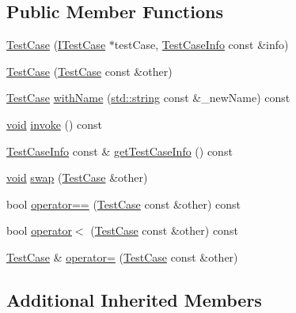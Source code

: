 \subsection*{Public Member Functions}
\begin{DoxyCompactItemize}
\item 
\hyperlink{class_catch_1_1_test_case_a03a5b913484681bd6d398dc5e9c2a907}{Test\+Case} (\hyperlink{struct_catch_1_1_i_test_case}{I\+Test\+Case} $\ast$test\+Case, \hyperlink{struct_catch_1_1_test_case_info}{Test\+Case\+Info} const \&info)
\item 
\hyperlink{class_catch_1_1_test_case_ac0011d3789edc3e44edb41f13c4775a0}{Test\+Case} (\hyperlink{class_catch_1_1_test_case}{Test\+Case} const \&other)
\item 
\hyperlink{class_catch_1_1_test_case}{Test\+Case} \hyperlink{class_catch_1_1_test_case_ab6dbc6c82b7c1680013c67bdedccfc8e}{with\+Name} (\hyperlink{_s_d_l__opengl__glext_8h_ae84541b4f3d8e1ea24ec0f466a8c568b}{std\+::string} const \&\+\_\+new\+Name) const 
\item 
\hyperlink{_s_d_l__opengles2__gl2ext_8h_ae5d8fa23ad07c48bb609509eae494c95}{void} \hyperlink{class_catch_1_1_test_case_aac2e028135cc88c3e3aac04650960a6c}{invoke} () const 
\item 
\hyperlink{struct_catch_1_1_test_case_info}{Test\+Case\+Info} const \& \hyperlink{class_catch_1_1_test_case_a25c03661ab092431cdff10df5c58a5a7}{get\+Test\+Case\+Info} () const 
\item 
\hyperlink{_s_d_l__opengles2__gl2ext_8h_ae5d8fa23ad07c48bb609509eae494c95}{void} \hyperlink{class_catch_1_1_test_case_aee38f908faf10b905b209ca388275413}{swap} (\hyperlink{class_catch_1_1_test_case}{Test\+Case} \&other)
\item 
bool \hyperlink{class_catch_1_1_test_case_a40eab521b316c7d476f6b4dd1c33eec8}{operator==} (\hyperlink{class_catch_1_1_test_case}{Test\+Case} const \&other) const 
\item 
bool \hyperlink{class_catch_1_1_test_case_aa5174e85e3aac6e7398dee9c76730324}{operator$<$} (\hyperlink{class_catch_1_1_test_case}{Test\+Case} const \&other) const 
\item 
\hyperlink{class_catch_1_1_test_case}{Test\+Case} \& \hyperlink{class_catch_1_1_test_case_a8022e3f74232f7887d2d2cbbc8876502}{operator=} (\hyperlink{class_catch_1_1_test_case}{Test\+Case} const \&other)
\end{DoxyCompactItemize}
\subsection*{Additional Inherited Members}


